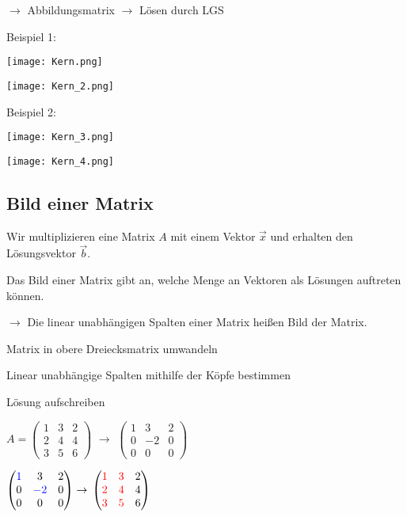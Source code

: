 \begin{multicols*}{3}
    {$\rightarrow$ Abbildungsmatrix  $\rightarrow$ Lösen durch LGS}

    {Beispiel 1:}

    {\texttt{[image: Kern.png]}}

    {\texttt{[image: Kern\_2.png]}}


    
    {Beispiel 2:}

    {\texttt{[image: Kern\_3.png]}}

    {\texttt{[image: Kern\_4.png]}}
    \vfill\null
    \columnbreak
    \subsection{ Bild einer Matrix}
    {Wir multiplizieren eine Matrix $A$  mit einem Vektor $\vec{x}$
        und erhalten den Lösungsvektor $\vec{b}$.}

    {Das Bild einer Matrix gibt an, welche Menge an Vektoren als Lösungen auftreten können.}

    {$\to$ Die linear unabhängigen Spalten einer Matrix heißen Bild der Matrix.}



    { Matrix in obere Dreiecksmatrix umwandeln}

    { Linear unabhängige Spalten mithilfe der Köpfe bestimmen}

    { Lösung aufschreiben}

    {$A =  \begin{pmatrix} 1 & 3 & 2 \\ 2 & 4 & 4 \\ 3 & 5 & 6 \end{pmatrix}$   {$\to$ $\begin{pmatrix} 1 & 3 & 2 \\ 0 & -2 & 0 \\ 0 & 0 & 0 \end{pmatrix}$}}

    { $\begin{pmatrix} {\color{blue}1} & 3 & 2 \\ 0 & {\color{blue}-2} & 0 \\ 0 & 0 & 0 \end{pmatrix} \rightarrow$   $\begin{pmatrix} {\color{red}1} & {\color{red}3} & 2 \\ {\color{red}2} & {\color{red}4} & 4 \\ {\color{red}3} & {\color{red}5} & 6 \end{pmatrix}$}


\end{multicols*}
